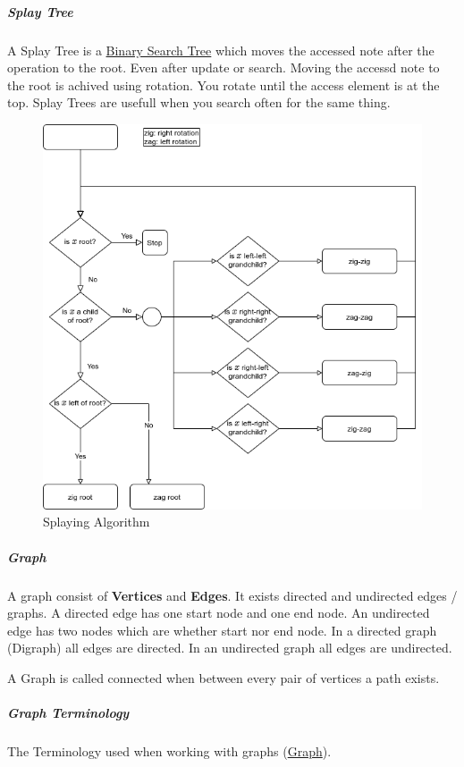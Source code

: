 \documentclass[11pt,twoside,twocolumn,landscape]{article}
\begin{document}
\subparagraph{Splay Tree}
\label{sec:org73afdc8}

A Splay Tree is a \href{../../../roam/20211008140953-binary_search_tree.org}{Binary Search Tree} which moves the accessed note after the operation to the root.
Even after update or search.
Moving the accessd note to the root is achived using rotation.
You rotate until the access element is at the top.
Splay Trees are usefull when you search often for the same thing.

\begin{figure}[htbp]
\centering
\includegraphics[width=.9\linewidth]{img/splaying.png}
\caption{\label{fig:orgb068683}Splaying Algorithm}
\end{figure}

\subparagraph{Graph}
\label{sec:org3ed1dd6}

A graph consist of \textbf{Vertices} and \textbf{Edges}.
It exists directed and undirected edges / graphs.
A directed edge has one start node and one end node.
An undirected edge has two nodes which are whether start nor end node.
In a directed graph (Digraph) all edges are directed.
In an undirected graph all edges are undirected.


A Graph is called connected when between every pair of vertices a path exists.

\subparagraph{Graph Terminology}
\label{sec:orgd0f2bb8}

The Terminology used when working with graphs (\href{../../../roam/20220201163000-graph.org}{Graph}).
\end{document}
